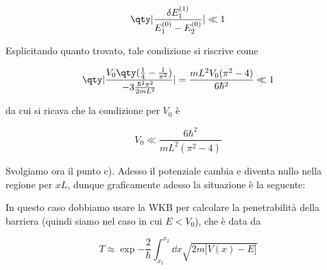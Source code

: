 \begin{soluzione}
   \begin{equation*}
      \qty| \frac{\delta E_1^{(1)}}{E_1^{(0)} - E_2^{(0)}} | \ll 1
   \end{equation*}

   Esplicitando quanto trovato, tale condizione si riscrive come

   \begin{equation*}
      \qty| \frac{V_0\qty( \frac{1}{4} - \frac{1}{\pi^2} )}{-3 \frac{\hbar^2 \pi^2}{2 m L^2}} |
      =\frac{mL^2 V_0 (\pi^2 - 4)}{6\hbar^2}
      \ll 1
   \end{equation*}

   da cui si ricava che la condizione per $V_0$ è

   \begin{equation*}
      V_0 \ll \frac{6\hbar^2}{m L^2 (\pi^2 - 4)}
   \end{equation*}
   
   Svolgiamo ora il punto c). Adesso il potenziale cambia e diventa nullo nella regione per $xL$, dunque graficamente adesso la situazione è la seguente:
   
   \begin{figure}[H]
      \centering
   \end{figure}

   In questo caso dobbiamo usare la WKB per calcolare la penetrabilità della barriera (quindi siamo nel caso in cui $E<V_0$), che è data da

   \begin{equation*}
      T
      \approx \exp{ -\frac{2}{\hbar} \int_{x_1}^{x_2} \dd{x} \sqrt{ 2m \bigl[ V(x) - E \bigr] } }
   \end{equation*}


\end{soluzione}
